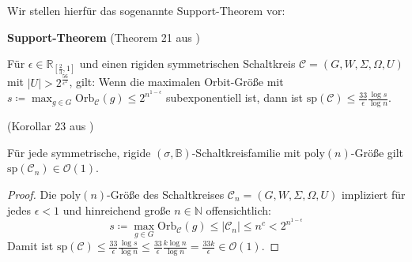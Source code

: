 Wir stellen hierfür das sogenannte Support-Theorem vor:
\begin{thm}
\textbf{\label{thm:Support-Theorem}Support-Theorem} (Theorem 21 aus
\cite{AD2014})

Für $\epsilon\in\mathbb{R}_{\left[\frac{2}{3},1\right]}$ und einen
rigiden symmetrischen Schaltkreis $\mathcal{C}=\left(G,W,\Sigma,\Omega,U\right)$
mit $\left|U\right|>2^{\frac{56}{\epsilon^{2}}}$, gilt: Wenn die
maximalen Orbit-Größe mit $s\coloneqq\max_{g\in G}\mathrm{Orb}_{\mathcal{C}}\left(g\right)\leqslant2^{n^{1-\epsilon}}$
subexponentiell ist, dann ist $\mathrm{sp}\left(\mathcal{C}\right)\leqslant\frac{33}{\epsilon}\frac{\log s}{\log n}$.
\end{thm}
\begin{cor}
\label{cor:korollar-23}(Korollar 23 aus \cite{AD2014})

Für jede symmetrische, rigide $\left(\sigma,\mathbb{B}\right)$-Schaltkreisfamilie
mit $\mathrm{poly}\left(n\right)$-Größe gilt $\mathrm{sp}\left(\mathcal{C}_{n}\right)\in\mathcal{O}\left(1\right)$.
\end{cor}
\begin{proof}
Die $\mathrm{poly}\left(n\right)$-Größe des Schaltkreises $\mathcal{C}_{n}=\left(G,W,\Sigma,\Omega,U\right)$
impliziert für jedes $\epsilon<1$ und hinreichend große $n\in\mathbb{N}$
offensichtlich: 
\[
s\coloneqq\max_{g\in G}\mathrm{Orb}_{\mathcal{C}}\left(g\right)\leqslant\left|\mathcal{C}_{n}\right|\leqslant n^{c}<2^{n^{1-\epsilon}}
\]
Damit ist $\mathrm{sp}\left(\mathcal{C}\right)\leqslant\frac{33}{\epsilon}\frac{\log s}{\log n}\leqslant\frac{33}{\epsilon}\frac{k\log n}{\log n}=\frac{33k}{\epsilon}\in\mathcal{O}\left(1\right)$. 
\end{proof}

